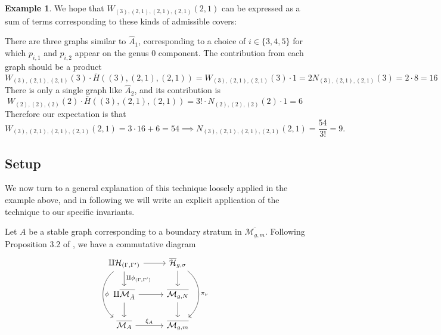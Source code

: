 \documentclass[11pt]{article}           %
\newcommand{\Hb}{\overline{\mathcal H}}
\theoremstyle{definition}
\newtheorem{eg}[thm]{Example}
\begin{document}
\begin{eg}

                                    We hope that $W_{(3),(2,1),(2,1),(2,1)}(2,1)$ can be expressed
                                    as a sum of terms corresponding to these kinds of
                                    admissible covers:

                                    There are three graphs similar to $\hat A_1$, corresponding to a choice of $i\in\{3,4,5\}$ for which $p_{i,1}$ and $p_{i,2}$ appear on the genus $0$ component. The contribution from each graph should be a product
                                    \[
                                    W_{(3),(2,1),(2,1)}(3)\cdot \overline H((3),(2,1),(2,1))=W_{(3),(2,1),(2,1)}(3)\cdot 1=2N_{(3),(2,1),(2,1)}(3)=2\cdot 8=16
                                    \]
                                    There is only a single graph like $\hat A_2$,
                                    and its contribution is
                                    \[
                                    W_{(2),(2),(2)}(2)\cdot \overline H((3),(2,1),(2,1))=3!\cdot N_{(2),(2),(2)}(2)\cdot 1=6
                                    \]
                                    Therefore our expectation is that
                                    \[
                                    W_{(3),(2,1),(2,1),(2,1)}(2,1)=3\cdot 16+6=54\implies N_{(3),(2,1),(2,1),(2,1)}(2,1)=\frac{54}{3!}=9.
                                    \]
  \end{eg}

                \subsection{Setup}

                We now turn to a general explanation of this technique loosely applied in the example above, and in following \cite{Generalized} we will write an explicit application of the technique to our specific invariants.
                


Let $A$ be a stable graph
corresponding to a boundary stratum in $\overline{\mathcal M_{g,m}}$.
Following Proposition 3.2 of \cite{Lian}, we have a commutative diagram
\[\begin{tikzcd}
\amalg \mathcal H_{(\Gamma,\Gamma')} & \Hb_{g,\sigma} \\
\amalg \overline{\mathcal M_{\hat A}} & \overline{\mathcal M_{g,N}} \\
	\overline{\mathcal M_A} & \overline{\mathcal M_{g,m}}
	\arrow[from=1-1, to=1-2]
	\arrow[from=1-1, to=2-1, "\amalg \phi_{(\Gamma,\Gamma')}"]
        \arrow[from=2-1, to=3-1]
	\arrow[from=1-2, to=2-2]
	\arrow[from=2-1, to=2-2]
        \arrow[from=2-2, to=3-2]
        \arrow[from=3-1, to=3-2, "\xi_A"]
        \arrow[from=1-2, to=3-2, bend left=52, "\pi_{\nu}"]
        \arrow[from=1-1, to=3-1, bend  right=52, "\phi"]
\end{tikzcd}\]
\end{document}
